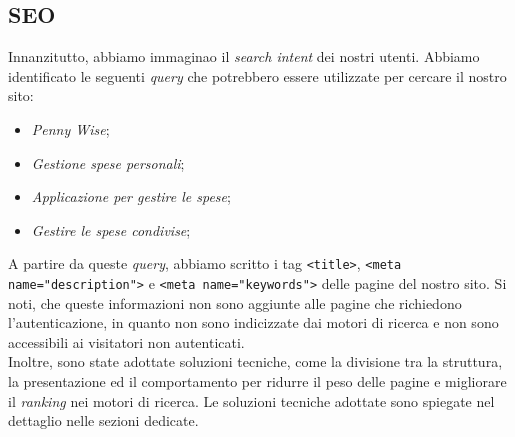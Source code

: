 \subsection{SEO}

Innanzitutto, abbiamo immaginao il \textit{search intent} dei nostri utenti. 
Abbiamo identificato le seguenti \textit{query} che potrebbero essere 
utilizzate per cercare il nostro sito:
\begin{itemize}
	\item \textit{Penny Wise};
	\item \textit{Gestione spese personali};
	\item \textit{Applicazione per gestire le spese};
	\item \textit{Gestire le spese condivise};
\end{itemize}

A partire da queste \textit{query}, abbiamo scritto i tag \texttt{<title>},
\texttt{<meta name="description">} e \texttt{<meta name="keywords">} delle
pagine del nostro sito. Si noti, che queste informazioni non sono aggiunte alle
pagine che richiedono l'autenticazione, in quanto non sono indicizzate dai
motori di ricerca e non sono accessibili ai visitatori non autenticati.\\
Inoltre, sono state adottate soluzioni tecniche, come la
divisione tra la struttura, la presentazione ed il comportamento per ridurre il
peso delle pagine e migliorare il \textit{ranking} nei motori di ricerca. Le
soluzioni tecniche adottate sono spiegate nel dettaglio nelle sezioni dedicate.
